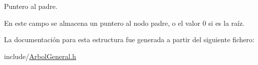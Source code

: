 Puntero al padre. 

En este campo se almacena un puntero al nodo padre, o el valor 0 si es la raíz. 

La documentación para esta estructura fue generada a partir del siguiente fichero\-:\begin{DoxyCompactItemize}
\item 
include/\hyperlink{ArbolGeneral_8h}{Arbol\-General.\-h}\end{DoxyCompactItemize}
